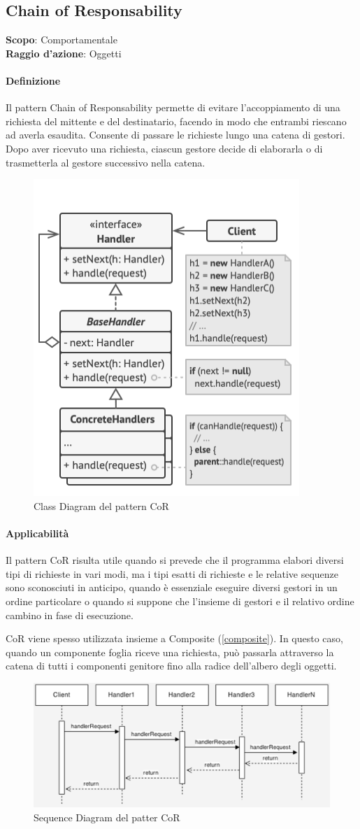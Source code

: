 \subsection{Chain of Responsability}
\label{chain-of-responsability}

\textbf{Scopo}: Comportamentale \\
\textbf{Raggio d'azione}: Oggetti

\paragraph{Definizione} Il pattern Chain of Responsability permette di evitare l'accoppiamento di una richiesta del mittente e del destinatario, facendo in modo che entrambi riescano ad averla esaudita. Consente di passare le richieste lungo una catena di gestori. Dopo aver ricevuto una richiesta, ciascun gestore decide di elaborarla o di trasmetterla al gestore successivo nella catena.

\begin{figure}[H]
    \centering
    \includegraphics[width=0.4\linewidth]{assets/pattern/chain-of-responsability/cor-struttura.png}
    \caption{Class Diagram del pattern CoR}
\end{figure}

\paragraph{Applicabilità} Il pattern CoR risulta utile quando si prevede che il programma elabori diversi tipi di richieste in vari modi, ma i tipi esatti di richieste e le relative sequenze sono sconosciuti in anticipo, quando è essenziale eseguire diversi gestori in un ordine particolare o quando si suppone che l'insieme di gestori e il relativo ordine cambino in fase di esecuzione.

CoR viene spesso utilizzata insieme a Composite (\ref{composite}). In questo caso, quando un componente foglia riceve una richiesta, può passarla attraverso la catena di tutti i componenti genitore fino alla radice dell'albero degli oggetti.

\begin{figure}[H]
    \centering
    \includegraphics[width=0.8\linewidth]{assets/pattern/chain-of-responsability/cor-sequence.png}
    \caption{Sequence Diagram del patter CoR}
\end{figure}

\newpage